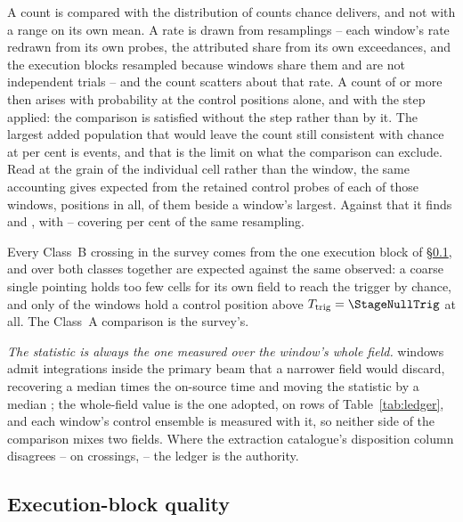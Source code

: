 A count is compared with the distribution of counts chance delivers, and
not with a range on its own mean. A rate is drawn from \CeNBoot{} resamplings
-- each window's rate redrawn from its own \NCtrl{} probes, the attributed
share from its own \CeNExc{} exceedances, and the execution blocks resampled
because windows share them and are not independent trials -- and the count
scatters about that rate. A count of \CeObs{} or more then arises with
probability \CeProbNull{} at the control positions alone, and \CeProbStep{}
with the step applied: the comparison is satisfied without the step rather
than by it. The largest added population that would leave the count still
consistent with chance at \CeCovPct{} per cent is \CeAddLim{} events, and
that is the limit on what the comparison can exclude. Read at the grain of
the individual cell rather than the window, the same accounting gives
\CkExp{} expected from the \CkNCtrlPerWin{} retained control probes of each
of those \CkNWin{} windows, \CkNCtrlPos{} positions in all, \CkExpSec{}
of them beside a window's largest. Against that it finds \CkNObs{} and
\CkNSecUnattr, with \CkLo--\CkHi{} covering \CeCovPct{} per cent of the same
resampling.

Every Class~B crossing in the survey comes from the one execution block of
\S\ref{sec:blockquality}, and over both classes together \CeExpSurv{} are
expected against the same \CeObs{} observed: a coarse single pointing holds
too few cells for its own field to reach the trigger by chance, and only
\NCtrlWinObs{} of the \NWindows{} windows hold a control position above
$T_{\rm trig}=\StageNullTrig$ at all. The Class~A comparison is the survey's.

\emph{The statistic is always the one measured over the window's whole field.}
\StNRep{} windows admit integrations inside the primary beam that a narrower
field would discard, recovering a median \StRepOnsrc{} times the on-source
time and moving the statistic by a median \StRepDT; the whole-field value is
the one adopted, on \StRepAdopted{} rows of Table~\ref{tab:ledger}, and each
window's control ensemble is measured with it, so neither side of the
comparison mixes two fields. Where the extraction catalogue's disposition
column disagrees -- on \StRepFell{} crossings, \StRepAttrClause{} -- the
ledger is the authority.

\subsection{Execution-block quality}
\label{sec:blockquality}

